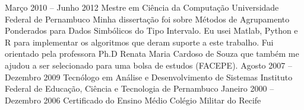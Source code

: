 \cvmetaevent
{Março 2010 – Junho 2012}
{Mestre em Ciência da Computação}
{Universidade Federal de Pernambuco}
{Minha dissertação foi sobre Métodos de Agrupamento Ponderados
para Dados Simbólicos do Tipo Intervalo. Eu usei Matlab, Python e R para implementar os algoritmos que deram suporte a este trabalho. Fui orientado pela professora Ph.D Renata Maria Cardoso de Souza que também me ajudou a ser selecionado para uma bolsa de estudos (FACEPE).}
\cvmetaevent
{Agosto 2007 – Dezembro 2009}
{Tecnólogo em Análise e Desenvolvimento de Sistemas}
{Instituto Federal de Educação, Ciência e Tecnologia de Pernambuco}
{}
\cvmetaevent
{Janeiro 2000 – Dezembro 2006}
{Certificado do Ensino Médio}
{Colégio Militar do Recife}
{}

